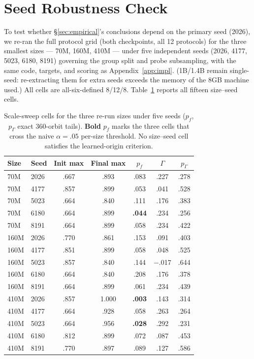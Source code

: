 \documentclass[11pt]{article}
\begin{document}
\section{Seed Robustness Check}
\label{app:seed}

To test whether \S\ref{sec:empirical}'s conclusions depend on the primary seed (2026), we re-ran the full protocol grid (both checkpoints, all 12 protocols) for the three smallest sizes --- 70M, 160M, 410M --- under five independent seeds (2026, 4177, 5023, 6180, 8191) governing the group split and probe subsampling, with the same code, targets, and scoring as Appendix~\ref{app:impl}. (1B/1.4B remain single-seed: re-extracting them for extra seeds exceeds the memory of the 8GB machine used.) All cells are all-six-defined 8/12/8. Table~\ref{tab:seedcheck} reports all fifteen size--seed cells.

\begin{table}[h]
\centering\scriptsize
\setlength{\tabcolsep}{3pt}
\begin{tabular}{llccccc}
\toprule
Size & Seed & Init max & Final max & $p_f$ & $\Gamma$ & $p_\Gamma$ \\
\midrule
70M  & 2026 & .667 & .893  & .083 & .227    & .278 \\
70M  & 4177 & .857 & .899  & .053 & .041    & .528 \\
70M  & 5023 & .664 & .840  & .111 & .176    & .383 \\
70M  & 6180 & .664 & .899  & \textbf{.044} & .234 & .256 \\
70M  & 8191 & .664 & .899  & .058 & .234    & .422 \\
\midrule
160M & 2026 & .770 & .861  & .153 & .091    & .403 \\
160M & 4177 & .851 & .899  & .058 & .048    & .525 \\
160M & 5023 & .857 & .840  & .144 & $-$.017 & .644 \\
160M & 6180 & .664 & .840  & .208 & .176    & .378 \\
160M & 8191 & .664 & .899  & .061 & .234    & .439 \\
\midrule
410M & 2026 & .857 & 1.000 & \textbf{.003} & .143 & .314 \\
410M & 4177 & .664 & .928  & .058 & .263    & .264 \\
410M & 5023 & .664 & .956  & \textbf{.028} & .292 & .231 \\
410M & 6180 & .812 & .899  & .072 & .087    & .453 \\
410M & 8191 & .770 & .897  & .089 & .127    & .586 \\
\bottomrule
\end{tabular}
\caption{Scale-sweep cells for the three re-run sizes under five seeds ($p_f$, $p_\Gamma$ exact 360-orbit tails). \textbf{Bold} $p_f$ marks the three cells that cross the naive $\alpha=.05$ per-size threshold. No size--seed cell satisfies the learned-origin criterion.}
\label{tab:seedcheck}
\end{table}
\end{document}
